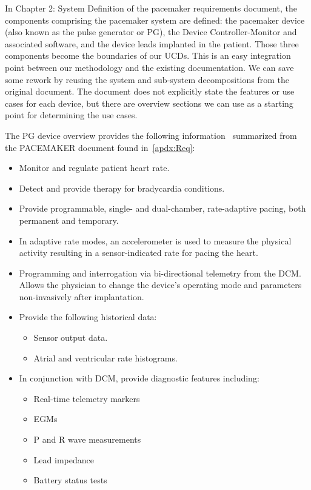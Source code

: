 In Chapter 2: System Definition of the pacemaker requirements document, the components comprising the pacemaker system are defined: the pacemaker device (also known as the pulse generator or PG), the Device Controller-Monitor and associated software, and the device leads implanted in the patient. Those three components become the boundaries of our UCDs. This is an easy integration point between our methodology and the existing documentation. We can save some rework by reusing the system and sub-system decompositions from the original document. The document does not explicitly state the features or use cases for each device, but there are overview sections we can use as a starting point for determining the use cases.

The PG device overview provides the following information~\cite{scientific2007pacemaker} summarized from the PACEMAKER document found in~\ref{apdx:Req}:
\begin{itemize}
	\item Monitor and regulate patient heart rate.
	\item Detect and provide therapy for bradycardia conditions.
	\item Provide programmable, single- and dual-chamber, rate-adaptive pacing, both permanent and temporary.
	\item In adaptive rate modes, an accelerometer is used to measure the physical activity resulting in a sensor-indicated rate for pacing the heart.
	\item Programming and interrogation via bi-directional telemetry from the DCM. Allows the physician to change the device's operating mode and parameters non-invasively after implantation.
	\item Provide the following historical data:
	\begin{itemize}
		\item Sensor output data.
		\item Atrial and ventricular rate histograms.
	\end{itemize}
	\item In conjunction with DCM, provide diagnostic features including:
	\begin{itemize}
		\item Real-time telemetry markers
		\item EGMs
		\item P and R wave measurements
		\item Lead impedance
		\item Battery status tests
	\end{itemize}
\end{itemize}

